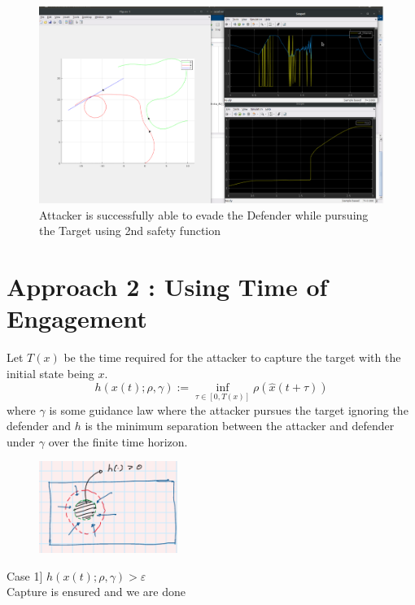 \documentclass[11pt]{article}
\theoremstyle{definition}
\theoremstyle{remark}
\begin{document}
\begin{figure}
    \centering
    \includegraphics[width=1\textwidth]{sim2case2.png}
    \caption{Attacker is successfully able to evade the Defender while pursuing the Target using 2nd safety function}
\end{figure}

\section{Approach 2 : Using Time of Engagement}\label{sec:6}
Let $T(x)$ be the time required for the attacker to capture the target with the initial state being $x$.
\begin{equation} \label{eqn:time_to_go_h}
    h(x(t);\rho , \gamma) := \inf_{\tau \in [0,T(x)]} \rho (\hat{x}(t + \tau))
\end{equation}
where $\gamma$ is some guidance law where the attacker pursues the target ignoring the defender and $h$ is the minimum separation between the attacker and defender under $\gamma$ over the finite time horizon.\\
\begin{figure}
    \centering
    \includegraphics[width=0.4\textwidth]{tad_approach2.png}
\end{figure}

Case 1] $h(x(t);\rho , \gamma) > \varepsilon$\\
Capture is ensured and we are done\\
\end{document}
